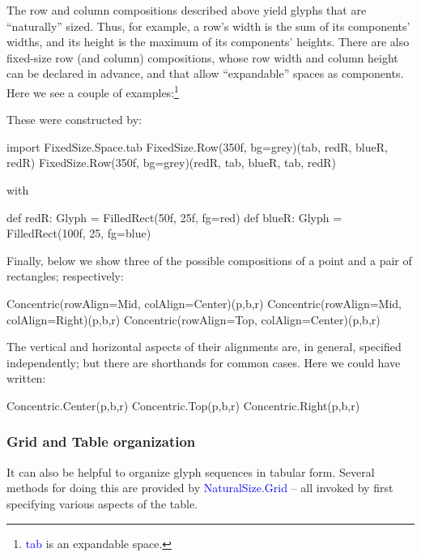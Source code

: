 \documentclass[12pt,a4paper]{article}
\def\Scala#1{\textcolor{blue}{\textsf{#1}}}
\def\SSS#1{\subsubsection*{#1}}
\begin{document}
The row and column compositions described above yield glyphs that
are ``naturally'' sized. Thus, for example, a row's width is the
sum of its components' widths, and its height is the maximum of its
components' heights. There are also fixed-size row (and column)
compositions, whose row width and column height can be declared in advance,
and that allow ``expandable'' spaces as components. Here we see a couple of examples:\footnote{\Scala{tab} is
an expandable space.}

\begin{center}
\quad\quad
{}
\end{center}

These were constructed by:
\begin{scala}
import FixedSize.Space.tab
FixedSize.Row(350f, bg=grey)(tab, redR, blueR, redR)
FixedSize.Row(350f, bg=grey)(redR, tab, blueR, tab, redR)
\end{scala}
with
\begin{scala}
def redR:  Glyph = FilledRect(50f, 25f, fg=red)
def blueR: Glyph = FilledRect(100f, 25, fg=blue)
\end{scala}

Finally, below we show three of the possible  
compositions of a point and a pair of rectangles; respectively:
\begin{scala}
        Concentric(rowAlign=Mid, colAlign=Center)(p,b,r)
        Concentric(rowAlign=Mid, colAlign=Right)(p,b,r)
        Concentric(rowAlign=Top, colAlign=Center)(p,b,r)      
\end{scala}

\begin{center}
\quad\quad
{}
\quad\quad
{} 
\end{center}


The vertical and horizontal aspects of their alignments are, in general,
specified independently; but there are shorthands for common cases. Here
we could have written:

\begin{scala}
        Concentric.Center(p,b,r)
        Concentric.Top(p,b,r)
        Concentric.Right(p,b,r)      
\end{scala}

\clearpage
\SSS{Grid and Table organization}
It can also be helpful to organize glyph sequences in tabular
form. Several methods for doing
this are provided by \Scala{NaturalSize.Grid} --
all invoked by first specifying various aspects of the table.
\end{document}
